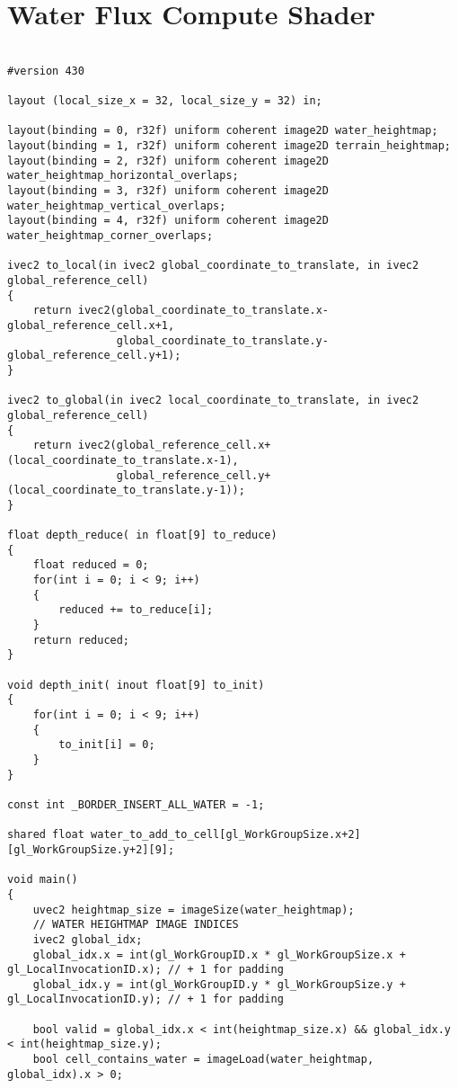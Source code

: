 \chapter{Water Flux Compute Shader} \label{AppendixI}

\begin{verbatim}

#version 430

layout (local_size_x = 32, local_size_y = 32) in;

layout(binding = 0, r32f) uniform coherent image2D water_heightmap;
layout(binding = 1, r32f) uniform coherent image2D terrain_heightmap;
layout(binding = 2, r32f) uniform coherent image2D water_heightmap_horizontal_overlaps;
layout(binding = 3, r32f) uniform coherent image2D water_heightmap_vertical_overlaps;
layout(binding = 4, r32f) uniform coherent image2D water_heightmap_corner_overlaps;

ivec2 to_local(in ivec2 global_coordinate_to_translate, in ivec2 global_reference_cell)
{
    return ivec2(global_coordinate_to_translate.x-global_reference_cell.x+1,
                 global_coordinate_to_translate.y-global_reference_cell.y+1);
}

ivec2 to_global(in ivec2 local_coordinate_to_translate, in ivec2 global_reference_cell)
{
    return ivec2(global_reference_cell.x+(local_coordinate_to_translate.x-1),
                 global_reference_cell.y+(local_coordinate_to_translate.y-1));
}

float depth_reduce( in float[9] to_reduce)
{
    float reduced = 0;
    for(int i = 0; i < 9; i++)
    {
        reduced += to_reduce[i];
    }
    return reduced;
}

void depth_init( inout float[9] to_init)
{
    for(int i = 0; i < 9; i++)
    {
        to_init[i] = 0;
    }
}

const int _BORDER_INSERT_ALL_WATER = -1;

shared float water_to_add_to_cell[gl_WorkGroupSize.x+2][gl_WorkGroupSize.y+2][9];

void main()
{
    uvec2 heightmap_size = imageSize(water_heightmap);
    // WATER HEIGHTMAP IMAGE INDICES
    ivec2 global_idx;
    global_idx.x = int(gl_WorkGroupID.x * gl_WorkGroupSize.x + gl_LocalInvocationID.x); // + 1 for padding
    global_idx.y = int(gl_WorkGroupID.y * gl_WorkGroupSize.y + gl_LocalInvocationID.y); // + 1 for padding

    bool valid = global_idx.x < int(heightmap_size.x) && global_idx.y < int(heightmap_size.y);
    bool cell_contains_water = imageLoad(water_heightmap, global_idx).x > 0;


\end{verbatim}
